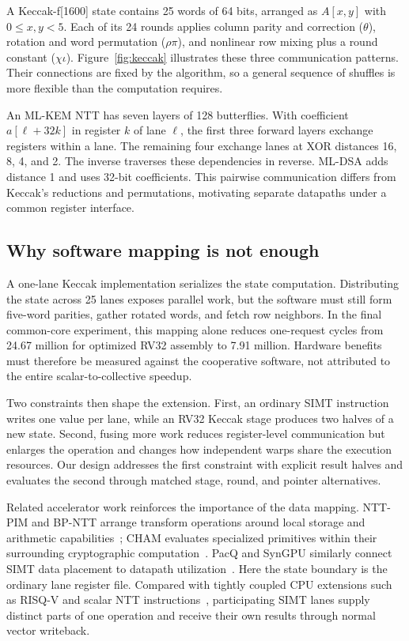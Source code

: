 \documentclass[conference,letterpaper]{IEEEtran}
\begin{document}
A Keccak-f[1600] state contains 25 words of 64 bits, arranged as $A[x,y]$
with $0\leq x,y<5$. Each of its 24 rounds applies column parity and correction
($\theta$), rotation and word permutation ($\rho\pi$), and nonlinear row
mixing plus a round constant ($\chi\iota$). Figure~\ref{fig:keccak} illustrates
these three communication patterns. Their connections are fixed by the
algorithm, so a general sequence of shuffles is more flexible than the
computation requires.



An ML-KEM NTT has seven layers of 128 butterflies. With coefficient
$a[\ell+32k]$ in register $k$ of lane $\ell$, the first three forward layers
exchange registers within a lane. The remaining four exchange lanes at
XOR distances 16, 8, 4, and 2. The inverse traverses these dependencies in
reverse. ML-DSA adds distance 1 and uses 32-bit coefficients. This pairwise
communication differs from Keccak's reductions and
permutations, motivating separate datapaths under a common register
interface.

\subsection{Why software mapping is not enough}
A one-lane Keccak implementation serializes the state computation.
Distributing the state across 25 lanes exposes parallel work, but the
software must still form five-word parities, gather rotated words, and fetch
row neighbors. In the final common-core experiment, this mapping alone
reduces one-request cycles from 24.67 million for optimized RV32 assembly
to 7.91 million. Hardware benefits must therefore be measured against the
cooperative software, not attributed to the entire scalar-to-collective
speedup.

Two constraints then shape the extension. First, an ordinary SIMT
instruction writes one value per lane, while an RV32 Keccak stage produces
two halves of a new state. Second, fusing more work reduces register-level
communication but enlarges the operation and changes how independent warps
share the execution resources. Our design addresses the first constraint
with explicit result halves and evaluates the second through matched
stage, round, and pointer alternatives.

Related accelerator work reinforces the importance of the data mapping.
NTT-PIM and BP-NTT arrange transform operations around local storage and
arithmetic capabilities~\cite{nttpim,bpntt}; CHAM evaluates specialized
primitives within their surrounding cryptographic computation~\cite{cham}.
PacQ and SynGPU similarly connect SIMT data placement to datapath
utilization~\cite{pacq,syngpu}. Here the state boundary is the ordinary lane
register file. Compared with tightly coupled CPU extensions such as
RISQ-V and scalar NTT instructions~\cite{risqv,nannipieri}, participating
SIMT lanes supply distinct parts of one operation and receive their own
results through normal vector writeback.
\end{document}
